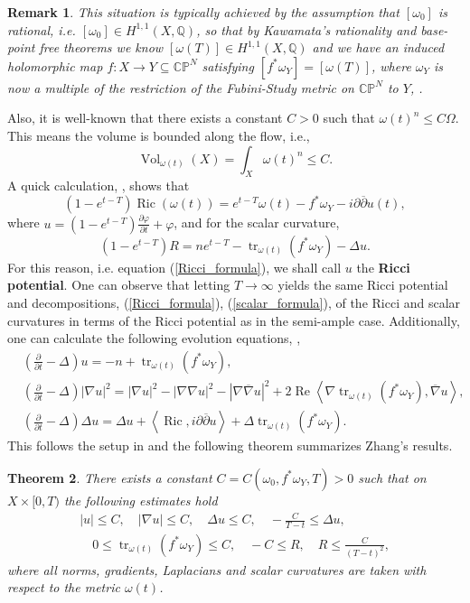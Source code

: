 \documentclass[12pt]{article}
\newtheorem{theorem}{Theorem}[section]
\newtheorem{remark}[theorem]{Remark}
\numberwithin{equation}{section}
\newcommand{\Q}{\mathbb{Q}}
\newcommand{\C}{\mathbb{C}}
\renewcommand{\P}{\mathbb{P}}
\renewcommand{\d}{\partial}
\newcommand{\dbar}{\overline{\partial}}
\DeclareMathOperator{\Ric}{Ric}
\DeclareMathOperator{\tr}{tr}
\DeclareMathOperator{\Vol}{Vol}
\DeclareMathOperator{\Real}{Re}
\newcommand{\oo}[1]{\overline{#1}}
\newcommand{\parabolic}[1]{\left(\frac{\d}{\d t} - \Delta_{#1}\right)}
\newcommand{\ip}[1]{\left\langle#1\right\rangle}
\begin{document}
\begin{remark}
This situation is typically achieved by the assumption that $[\omega_0]$ is rational, i.e. $[\omega_0] \in H^{1,1}(X,\Q)$, so that by Kawamata's rationality and base-point free theorems we know $[\omega(T)] \in H^{1,1}(X,\Q)$ and we have an induced holomorphic map $f: X \to Y \subseteq \C\P^N$ satisfying $[f^* \omega_Y] = [\omega(T)]$, where $\omega_Y$ is now a multiple of the restriction of the Fubini-Study metric on $\C\P^N$ to $Y$, \cite{Z10}.
\end{remark}

\noindent Also, it is well-known that there exists a constant $C > 0$ such that $\omega(t)^n \leq C \Omega$. This means the volume is bounded along the flow, i.e.,
\begin{equation*}
    \Vol_{\omega(t)}(X) = \int_X \omega(t)^n \leq C.
\end{equation*}
\noindent A quick calculation, \cite{Z10}, shows that
\begin{equation}\label{Ricci_formula}
    (1-e^{t-T})\Ric(\omega(t)) = e^{t-T} \omega(t) - f^* \omega_Y -i\d\dbar u(t),
\end{equation}
where $u = (1-e^{t-T})\frac{\d \varphi}{\d t} + \varphi$, and for the scalar curvature,
\begin{equation}\label{scalar_formula}
    (1-e^{t-T}) R = ne^{t-T} - \tr_{\omega(t)} (f^*\omega_Y) - \Delta u.
\end{equation}
For this reason, i.e. equation (\ref{Ricci_formula}), we shall call $u$ the \textbf{Ricci potential}. One can observe that letting $T \to \infty$ yields the same Ricci potential and decompositions, (\ref{Ricci_formula}), (\ref{scalar_formula}), of the Ricci and scalar curvatures in terms of the Ricci potential as in the semi-ample case. Additionally, one can calculate the following evolution equations, \cite{Z10},
\begin{align*}
    &\parabolic{} u = -n + \tr_{\omega(t)}(f^* \omega_Y),\\
    &\parabolic{} |\nabla u|^2 = |\nabla u|^2 - |\nabla \nabla u|^2 - |\nabla \oo{\nabla} u|^2 + 2 \Real\ip{\nabla \tr_{\omega(t)}(f^*\omega_Y), \oo{\nabla} u},\\
    &\parabolic{} \Delta u = \Delta u + \ip{\Ric, i\d\dbar u} + \Delta \tr_{\omega(t)}(f^*\omega_Y).
\end{align*}
This follows the setup in \cite{Z10} and the following theorem summarizes Zhang's results.

\begin{theorem}\label{bounds}
There exists a constant $C=C(\omega_0, f^*\omega_Y, T) > 0$ such that on $X \times [0,T)$ the following estimates hold
\begin{align*}
    |u| \leq C, \quad |\nabla u| \leq C, \quad \Delta u \leq C, \quad -\frac{C}{T - t} \leq \Delta u,\\
    \quad 0 \leq \tr_{\omega(t)} (f^*\omega_Y) \leq C, \quad -C \leq R, \quad R \leq \frac{C}{(T-t)^2},
\end{align*}
where all norms, gradients, Laplacians and scalar curvatures are taken with respect to the metric $\omega(t)$.
\end{theorem}
\end{document}
